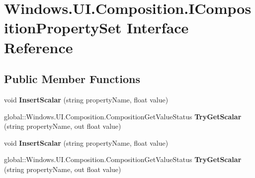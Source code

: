 \hypertarget{interface_windows_1_1_u_i_1_1_composition_1_1_i_composition_property_set}{}\section{Windows.\+U\+I.\+Composition.\+I\+Composition\+Property\+Set Interface Reference}
\label{interface_windows_1_1_u_i_1_1_composition_1_1_i_composition_property_set}
\subsection*{Public Member Functions}
\begin{DoxyCompactItemize}
\item 
\mbox{\label{interface_windows_1_1_u_i_1_1_composition_1_1_i_composition_property_set_af4dd4487fc38972bfc268e83ad782d5a}} 
void {\bfseries Insert\+Scalar} (string property\+Name, float value)
\item 
\mbox{\label{interface_windows_1_1_u_i_1_1_composition_1_1_i_composition_property_set_ad1dbb6a9859e7c0dfa6e06eb65170b25}} 
global\+::\+Windows.\+U\+I.\+Composition.\+Composition\+Get\+Value\+Status {\bfseries Try\+Get\+Scalar} (string property\+Name, out float value)
\item 
\mbox{\label{interface_windows_1_1_u_i_1_1_composition_1_1_i_composition_property_set_af4dd4487fc38972bfc268e83ad782d5a}} 
void {\bfseries Insert\+Scalar} (string property\+Name, float value)
\item 
\mbox{\label{interface_windows_1_1_u_i_1_1_composition_1_1_i_composition_property_set_ad1dbb6a9859e7c0dfa6e06eb65170b25}} 
global\+::\+Windows.\+U\+I.\+Composition.\+Composition\+Get\+Value\+Status {\bfseries Try\+Get\+Scalar} (string property\+Name, out float value)
\item 
\mbox{\label{interface_windows_1_1_u_i_1_1_composition_1_1_i_composition_property_set_af4dd4487fc38972bfc268e83ad782d5a}} 

\end{DoxyCompactItemize}
